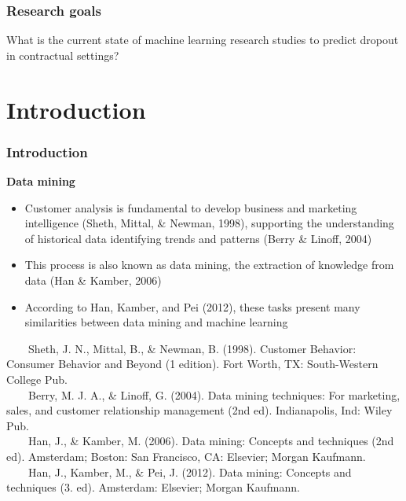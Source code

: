 \documentclass[10pt]{beamer}
\begin{document}
\begin{frame}
	\frametitle{Research goals}
	\Large{What is the current state of machine learning research studies to predict dropout in contractual settings?}

	
\end{frame}

\section{Introduction} %

\begin{frame}
	\frametitle{Introduction}
	\Large
	\textbf{Data mining}\\
		\begin{itemize} \normalsize
			\item Customer analysis is fundamental to develop business and marketing intelligence \footnotesize(Sheth, Mittal, \& Newman, 1998)\normalsize, supporting the understanding of historical data identifying trends and patterns \footnotesize(Berry \& Linoff, 2004)\normalsize
			\item This process is also known as data mining, the extraction of knowledge from data \footnotesize(Han \& Kamber, 2006)\normalsize
			\item According to \footnotesize Han, Kamber, and Pei (2012)\normalsize, these tasks present many similarities between data mining and machine learning
		\end{itemize}	
	\tiny
	~~~~Sheth, J. N., Mittal, B., \& Newman, B. (1998). Customer Behavior: Consumer Behavior and Beyond (1 edition). Fort Worth, TX: South-Western College Pub. \\
	~~~~Berry, M. J. A., \& Linoff, G. (2004). Data mining techniques: For marketing, sales, and customer relationship management (2nd ed). Indianapolis, Ind: Wiley Pub.\\
	~~~~Han, J., \& Kamber, M. (2006). Data mining: Concepts and techniques (2nd ed). Amsterdam; Boston: San Francisco, CA: Elsevier; Morgan Kaufmann.\\
	~~~~Han, J., Kamber, M., \& Pei, J. (2012). Data mining: Concepts and techniques (3. ed). Amsterdam: Elsevier; Morgan Kaufmann.\\

\end{frame}
\end{document}

